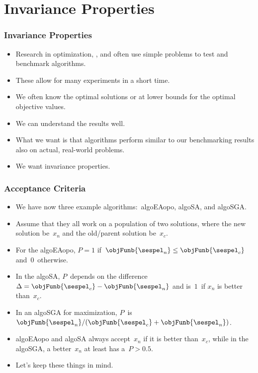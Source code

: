 \documentclass[aspectratio=169,mathserif,notheorems]{beamer}%
\begin{document}
\section{Invariance Properties}%
%
\begin{frame}%
\frametitle{Invariance Properties}%
\begin{itemize}%
\item Research in optimization, , and  often use simple problems to test and benchmark algorithms.%
\item<2-> These allow for many experiments in a short time.%
\item<3-> We often know the optimal solutions or at lower bounds for the optimal objective values.%
\item<4-> We can understand the results well.%
\item<5-> What we want is that algorithms perform similar to our benchmarking results also on actual, real-world problems.%
\item<6-> \alert{We want invariance properties.}\cite{OAAH2017IGOAAUPVIP,HA2014PDOCSSFTTP,JA2010LLCOTSIMMLEAOMFIRFLPS}%
\end{itemize}%
\end{frame}%
%
\begin{frame}%
\frametitle{Acceptance Criteria}%
\begin{itemize}%
\item We have now three example algorithms:~\gls{algoEAopo}, \gls{algoSA}, and \gls{algoSGA}.%
%
\item<2-> Assume that they all work on a population of two solutions, where the new solution be~$x_n$ and the old/parent solution be~$x_c$.%
%
\item<4-> For the \gls{algoEAopo}, $P=1$ if~$\objFunb{\sespel_n}\leq \objFunb{\sespel_c}$ and~$0$~otherwise.%
%
\item<5-> In the \gls{algoSA}, $P$~depends on the difference~$\Delta=\objFunb{\sespel_c}-\objFunb{\sespel_n}$ and is~$1$~if $x_n$ is better than~$x_c$.%
%
\item<6-> In an \gls{algoSGA} for maximization, $P$~is~$\objFunb{\sespel_n}/(\objFunb{\sespel_c}+\objFunb{\sespel_n})$.%
%
\item<8-> \gls{algoEAopo} and \gls{algoSA} always accept~$x_n$ if it is better than~$x_c$, while in the \gls{algoSGA}, a better~$x_n$ at least has a~$P>0.5$.%
%
\item<9-> Let's keep these things in mind.%
\end{itemize}%
\end{frame}%
\end{document}
